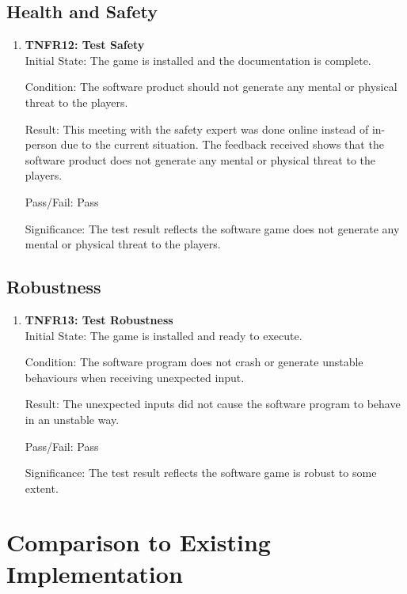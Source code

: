 \documentclass[12pt, titlepage]{article}
\begin{document}
\subsection{Health and Safety}
\begin{enumerate}
\item{\textbf{TNFR12: Test Safety \\}}
Initial State: The game is installed and the documentation is complete.

Condition: The software product should not generate any mental or physical threat to the players.

Result: This meeting with the safety expert was done online instead of in-person due to the current situation. The feedback received shows that the software product does not generate any mental or physical threat to the players.

Pass/Fail: Pass

Significance: The test result reflects the software game does not generate any mental or physical threat to the players.
\end{enumerate}

\subsection{Robustness}
\begin{enumerate}
\item{\textbf{TNFR13: Test Robustness \\}}
Initial State: The game is installed and ready to execute.

Condition: The software program does not crash or generate unstable behaviours when receiving unexpected input.

Result: The unexpected inputs did not cause the software program to behave in an unstable way.

Pass/Fail: Pass

Significance: The test result reflects the software game is robust to some extent.
\end{enumerate}

\section{Comparison to Existing Implementation}	
\end{document}

